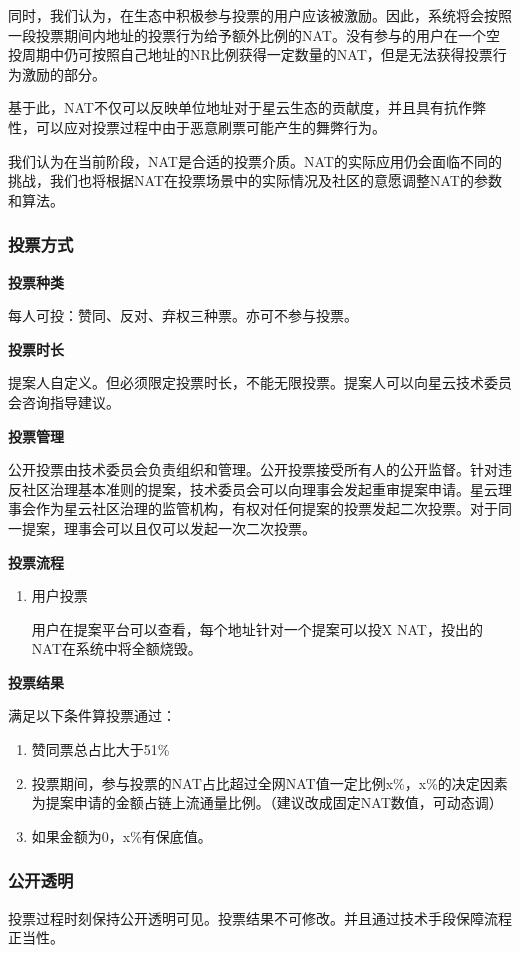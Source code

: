 同时，我们认为，在生态中积极参与投票的用户应该被激励。因此，系统将会按照一段投票期间内地址的投票行为给予额外比例的NAT。没有参与的用户在一个空投周期中仍可按照自己地址的NR比例获得一定数量的NAT，但是无法获得投票行为激励的部分。

基于此，NAT不仅可以反映单位地址对于星云生态的贡献度，并且具有抗作弊性，可以应对投票过程中由于恶意刷票可能产生的舞弊行为。

我们认为在当前阶段，NAT是合适的投票介质。NAT的实际应用仍会面临不同的挑战，我们也将根据NAT在投票场景中的实际情况及社区的意愿调整NAT的参数和算法。

\subsubsection{投票方式}
\textbf{投票种类}

每人可投：赞同、反对、弃权三种票。亦可不参与投票。

\textbf{投票时长}

提案人自定义。但必须限定投票时长，不能无限投票。提案人可以向星云技术委员会咨询指导建议。

\textbf{投票管理}

公开投票由技术委员会负责组织和管理。公开投票接受所有人的公开监督。针对违反社区治理基本准则的提案，技术委员会可以向理事会发起重审提案申请。星云理事会作为星云社区治理的监管机构，有权对任何提案的投票发起二次投票。对于同一提案，理事会可以且仅可以发起一次二次投票。

\textbf{投票流程}
\begin{enumerate}

\item 用户投票

用户在提案平台可以查看，每个地址针对一个提案可以投X NAT，投出的NAT在系统中将全额烧毁。

\end{enumerate}

\textbf{投票结果}

满足以下条件算投票通过：

\begin{enumerate}
\item 赞同票总占比大于51\%
\item 投票期间，参与投票的NAT占比超过全网NAT值一定比例x\%，x\%的决定因素为提案申请的金额占链上流通量比例。{\color{red}（建议改成固定NAT数值，可动态调）}
\item 如果金额为0，x\%有保底值。
\end{enumerate}

\subsubsection{公开透明}
投票过程时刻保持公开透明可见。投票结果不可修改。并且通过技术手段保障流程正当性。

